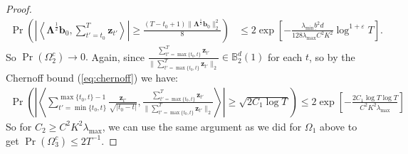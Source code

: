 \begin{proof}
\begin{align*}
    \Pr\left(\left|\left\langle\boldsymbol{\Lambda}^{\frac{1}{2}}\mathbf{b}_0, \sum_{t'=t_0}^T \mathbf{z}_{t'} \right\rangle\right| \geq \frac{(T-t_0+1) \lVert\boldsymbol{\Lambda}^{\frac{1}{2}} \mathbf{b}_0\rVert_2^2}{8}\right) &\leq 2\exp\left[-\frac{\lambda_{\min}\underline{b}^2d }{128\lambda_{\max}C^2K^2}\log^{1+\varepsilon} T\right].
\end{align*}
So $\Pr(\Omega_2^c) \to 0.$ Again, since $\frac{\sum_{t'=\max\{t_0,t\}}^{T}\mathbf{z}_{t'}}{\lVert\sum_{t'=\max\{t_0,t\}}^{T}\mathbf{z}_{t'}\rVert_2} \in \mathbb{B}_2^d(1)$ for each $t$, so by the Chernoff bound (\ref{eq:chernoff}) we have:
\begin{align*}
    \Pr\left(\left|\left\langle \sum_{t'=\min\{t_0,t\}}^{\max\{t_0,t\}-1}\frac{\mathbf{z}_{t'}}{\sqrt{|t_0-t|}}, \frac{\sum_{t'=\max\{t_0,t\}}^{T}\mathbf{z}_{t'}}{\lVert\sum_{t'=\max\{t_0,t\}}^{T}\mathbf{z}_{t'}\rVert_2}\right\rangle\right| \geq \sqrt{2C_1\log T}\right) \leq 2\exp\left[-\frac{2C_1\log T\log T}{C^2K^2\lambda_{\max}}\right] 
\end{align*}
So for $C_2 \geq C^2K^2\lambda_{\max}$, we can use the same argument as we did for $\Omega_1$ above to get $\Pr(\Omega_3^c) \leq 2T^{-1}$.



\end{proof}
